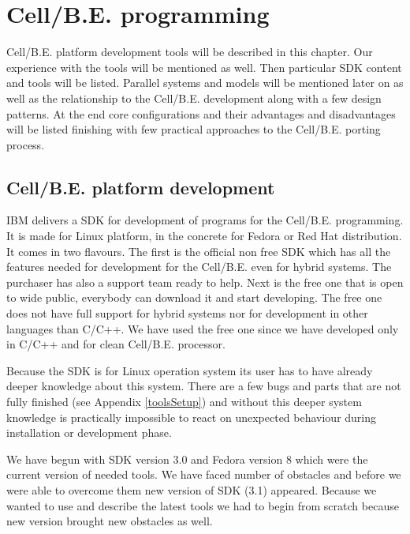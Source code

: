 \chapter {\mbox{Cell/B.E.} programming}
\par
\mbox{Cell/B.E.} platform development tools will be described in this chapter.
Our experience with the tools will be mentioned as well.
Then particular SDK content and tools will be listed.
Parallel systems and models will be mentioned later on as well as the relationship to the \mbox{Cell/B.E.} development along with a few design patterns.
At the end core configurations and their advantages and disadvantages will be listed finishing with few practical approaches to the \mbox{Cell/B.E.} porting process.

\section{\mbox{Cell/B.E.} platform development}
\par
IBM delivers a SDK for development of programs for the \mbox{Cell/B.E.} programming.
It is made for Linux platform, in the concrete for Fedora or Red Hat distribution.
It comes in two flavours.
The first is the official non free SDK which has all the features needed for development for the \mbox{Cell/B.E.} even for hybrid systems.
The purchaser has also a support team ready to help.
Next is the free one that is open to wide public, everybody can download it and start developing.
The free one does not have full support for hybrid systems nor for development in other languages than C/C++.
We have used the free one since we have developed only in C/C++ and for clean \mbox{Cell/B.E.} processor.

\par
Because the SDK is for Linux operation system its user has to have already deeper knowledge about this system.
There are a few bugs and parts that are not fully finished (see Appendix \ref{toolsSetup}) and without this deeper system knowledge is practically impossible to react on unexpected behaviour during installation or development phase.

\par
We have begun with SDK version 3.0 and Fedora version 8 which were the current version of needed tools.
We have faced number of obstacles and before we were able to overcome them new version of SDK (3.1) appeared.
Because we wanted to use and describe the latest tools we had to begin from scratch because new version brought new obstacles as well.

